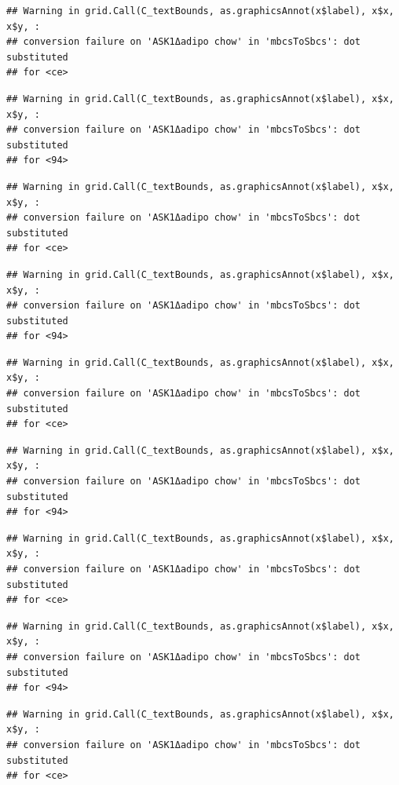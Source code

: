 \documentclass[]{book}
\begin{document}
\begin{verbatim}
## Warning in grid.Call(C_textBounds, as.graphicsAnnot(x$label), x$x, x$y, :
## conversion failure on 'ASK1Δadipo chow' in 'mbcsToSbcs': dot substituted
## for <ce>
\end{verbatim}

\begin{verbatim}
## Warning in grid.Call(C_textBounds, as.graphicsAnnot(x$label), x$x, x$y, :
## conversion failure on 'ASK1Δadipo chow' in 'mbcsToSbcs': dot substituted
## for <94>
\end{verbatim}

\begin{verbatim}
## Warning in grid.Call(C_textBounds, as.graphicsAnnot(x$label), x$x, x$y, :
## conversion failure on 'ASK1Δadipo chow' in 'mbcsToSbcs': dot substituted
## for <ce>
\end{verbatim}

\begin{verbatim}
## Warning in grid.Call(C_textBounds, as.graphicsAnnot(x$label), x$x, x$y, :
## conversion failure on 'ASK1Δadipo chow' in 'mbcsToSbcs': dot substituted
## for <94>
\end{verbatim}

\begin{verbatim}
## Warning in grid.Call(C_textBounds, as.graphicsAnnot(x$label), x$x, x$y, :
## conversion failure on 'ASK1Δadipo chow' in 'mbcsToSbcs': dot substituted
## for <ce>
\end{verbatim}

\begin{verbatim}
## Warning in grid.Call(C_textBounds, as.graphicsAnnot(x$label), x$x, x$y, :
## conversion failure on 'ASK1Δadipo chow' in 'mbcsToSbcs': dot substituted
## for <94>
\end{verbatim}

\begin{verbatim}
## Warning in grid.Call(C_textBounds, as.graphicsAnnot(x$label), x$x, x$y, :
## conversion failure on 'ASK1Δadipo chow' in 'mbcsToSbcs': dot substituted
## for <ce>
\end{verbatim}

\begin{verbatim}
## Warning in grid.Call(C_textBounds, as.graphicsAnnot(x$label), x$x, x$y, :
## conversion failure on 'ASK1Δadipo chow' in 'mbcsToSbcs': dot substituted
## for <94>
\end{verbatim}

\begin{verbatim}
## Warning in grid.Call(C_textBounds, as.graphicsAnnot(x$label), x$x, x$y, :
## conversion failure on 'ASK1Δadipo chow' in 'mbcsToSbcs': dot substituted
## for <ce>
\end{verbatim}
\end{document}
